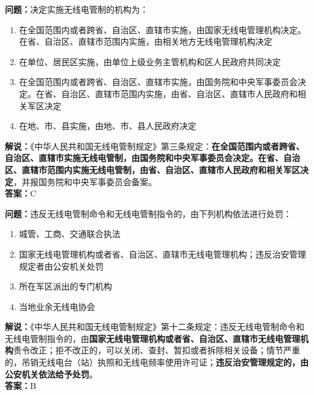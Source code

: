 \bigskip


\noindent\textbf{问题：}决定实施无线电管制的机构为：
\begin{enumerate}[label=\Alph*), leftmargin=3em]
	\item 在全国范围内或者跨省、自治区、直辖市实施，由国家无线电管理机构决定。在省、自治区、直辖市范围内实施，由相关地方无线电管理机构决定
	\item 在单位、居民区实施，由单位上级业务主管机构和区人民政府共同决定
	\item 在全国范围内或者跨省、自治区、直辖市实施，由国务院和中央军事委员会决定。在省、自治区、直辖市范围内实施，由省、自治区、直辖市人民政府和相关军区决定
	\item 在地、市、县实施，由地、市、县人民政府决定
\end{enumerate}
\noindent\textbf{解说：}《中华人民共和国无线电管制规定》第三条规定：\textbf{在全国范围内或者跨省、自治区、直辖市实施无线电管制，由国务院和中央军事委员会决定。在省、自治区、直辖市范围内实施无线电管制，由省、自治区、直辖市人民政府和相关军区决定}，并报国务院和中央军事委员会备案。\\\noindent\textbf{答案：}C


\bigskip


\noindent\textbf{问题：}违反无线电管制命令和无线电管制指令的，由下列机构依法进行处罚：
\begin{enumerate}[label=\Alph*), leftmargin=3em]
	
	\item 城管、工商、交通联合执法
	\item 国家无线电管理机构或者省、自治区、直辖市无线电管理机构；违反治安管理规定者由公安机关处罚
	\item 所在军区派出的专门机构
	\item 当地业余无线电协会
\end{enumerate}
\noindent\textbf{解说：}《中华人民共和国无线电管制规定》第十二条规定：违反无线电管制命令和无线电管制指令的，由\textbf{国家无线电管理机构或者省、自治区、直辖市无线电管理机构}责令改正；拒不改正的，可以关闭、查封、暂扣或者拆除相关设备；情节严重的，吊销无线电台（站）执照和无线电频率使用许可证；\textbf{违反治安管理规定的，由公安机关依法给予处罚}。\\\noindent\textbf{答案：}B


\bigskip


